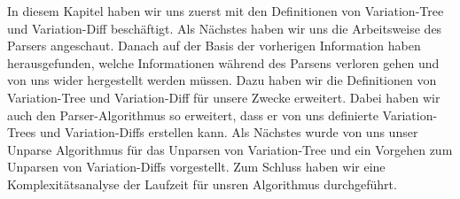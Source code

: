 In diesem Kapitel haben wir uns zuerst mit den Definitionen von Variation-Tree und Variation-Diff beschäftigt. Als Nächstes haben wir uns die Arbeitsweise des Parsers angeschaut. Danach auf der Basis der vorherigen Information haben herausgefunden, welche Informationen während des Parsens verloren gehen und von uns wider hergestellt werden müssen. Dazu haben wir die Definitionen von Variation-Tree und Variation-Diff für unsere Zwecke erweitert. Dabei haben wir auch den Parser-Algorithmus so erweitert, dass er von uns definierte Variation-Trees und Variation-Diffs erstellen kann. Als Nächstes wurde von uns unser Unparse Algorithmus für das Unparsen von Variation-Tree und ein Vorgehen zum Unparsen von Variation-Diffs vorgestellt. Zum Schluss haben wir eine Komplexitätsanalyse der Laufzeit für unsren Algorithmus durchgeführt.














